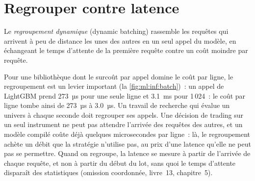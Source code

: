 \section{Regrouper contre latence}

\begin{definition}\label{def:ml:low-latency-inference:batch}
Le \emph{regroupement dynamique} (dynamic batching) rassemble les requêtes qui arrivent à peu de distance les unes des autres en un seul appel du modèle, en échangeant
le temps d'attente de la première requête contre un coût moindre par requête.
\end{definition}

Pour une bibliothèque dont le surcoût par appel domine le coût par ligne, le regroupement est un levier important (la \cref{fig:ml:inf:batch})~: un appel de LightGBM
prend 273~µs pour une seule ligne et 3.1~ms pour 1\,024~: le coût par ligne tombe ainsi de 273~µs à 3.0~µs. Un travail de recherche qui évalue
un univers à chaque seconde doit regrouper ses appels. Une décision de trading sur un seul instrument ne peut pas attendre l'arrivée des requêtes des autres, et un
modèle compilé coûte déjà quelques microsecondes par ligne~: là, le regroupement achète un débit que la stratégie n'utilise pas, au
prix d'une latence qu'elle ne peut pas se permettre. Quand on regroupe, la latence se mesure à partir de l'arrivée de chaque requête, et non
à partir du début du lot, sans quoi le temps d'attente disparaît des statistiques (omission coordonnée, livre~13, chapitre~5).

\begin{omfigure}

\label{fig:ml:inf:batch}
\end{omfigure}

